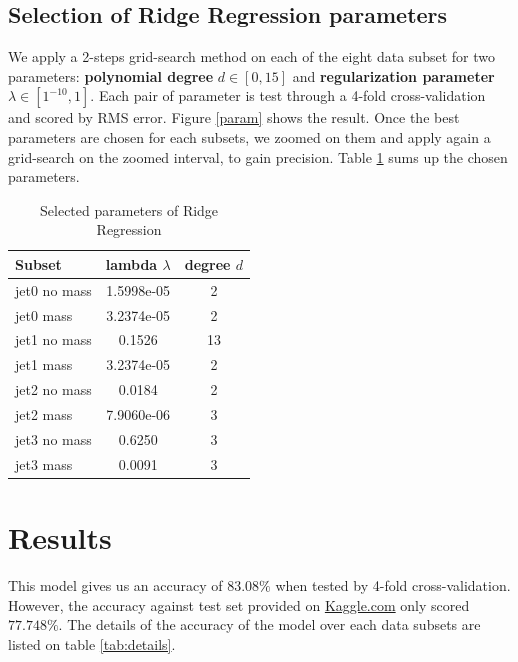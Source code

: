 \documentclass[10pt,conference,compsocconf]{IEEEtran}
\begin{document}
\subsection{Selection of Ridge Regression parameters}
We apply a 2-steps grid-search method on each of the eight data subset for two parameters: \textbf{polynomial degree} $d \in [0, 15]$ and \textbf{regularization parameter} $\lambda \in [1^{-10}, 1]$.  Each pair of parameter is test through a 4-fold cross-validation and scored by RMS error. Figure \ref{param} shows the result. Once the best parameters are chosen for each subsets, we zoomed on them and apply again a grid-search on the zoomed interval, to gain precision. Table \ref{tab:param} sums up the chosen parameters.

\begin{table}[htbp]
  \centering
  \begin{tabular}[c]{| l| | c | c |}
    \hline
    Subset 	& lambda $\lambda$ & degree $d$ \\
    \hline \hline
    jet0 no mass 			& 1.5998e-05	& 2		\\
    jet0 mass 				& 3.2374e-05	& 2		\\
    jet1 no mass				& 0.1526		& 13 		\\
    jet1 mass				& 3.2374e-05 	& 2 		\\
    jet2 no mass				& 0.0184		& 2		\\
    jet2 mass				& 7.9060e-06	& 3		\\
    jet3 no mass				& 0.6250		& 3		\\
    jet3 mass				& 0.0091		& 3		\\
    \hline
  \end{tabular}
  \caption{Selected parameters of Ridge Regression}
  \label{tab:param}
\end{table}




\section{Results}
This model gives us an accuracy of $83.08 \%$ when tested by 4-fold cross-validation. However, the accuracy against test set provided on {\color{blue}\href{https://www.kaggle.com}{Kaggle.com}} only scored $77.748\%$. The details of the accuracy of the model over each data subsets are listed on table \ref{tab:details}.
\end{document}
